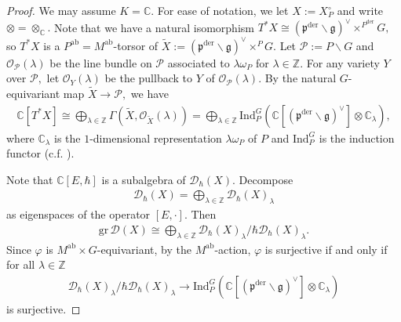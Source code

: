 \documentclass[11pt,a4paper,usenames,dvipsnames,reqno]{amsart}
\numberwithin{equation}{section}
\newcommand{\cc}{\mathbb C}
\newcommand{\zz}{\mathbb Z}
\newcommand{\fg}{\mathfrak g}
\newcommand{\fp}{\mathfrak p}
\newcommand{\der}{\mathrm{der}}
\theoremstyle{definition}
\theoremstyle{remark}
\begin{document}
\begin{proof}
We may assume $K=\cc$. For ease of notation, we let $X:=X_P^\circ$ and write $\otimes=\otimes_\cc.$ Note that we have a natural isomorphism $T^\ast X\cong (\mathfrak{p}^{\mathrm{der}}\backslash \mathfrak{g})^\vee\times ^{P^{\mathrm{der}}} G,$ so $T^\ast X$ is a $P^{\mathrm{ab}}=M^{\mathrm{ab}}$-torsor of $\widetilde{X}:= (\mathfrak{p}^{\mathrm{der}}\backslash \mathfrak{g})^\vee\times ^P G.$ Let $\mathcal{P}:=P\backslash G$ and $\mathcal{O}_{\mathcal{P}}(\lambda)$ be the line bundle on $\mathcal{P}$ associated to $\lambda\omega_P$ for $\lambda\in \zz.$ For any variety $Y$ over $\mathcal{P},$ let $\mathcal{O}_{Y}(\lambda)$ be the pullback to $Y$ of $\mathcal{O}_{\mathcal{P}}(\lambda).$ By the natural $G$-equivariant map $\widetilde{X}\longrightarrow \mathcal{P},$ we have 
\begin{align*}
    \cc[T^\ast X]\cong \bigoplus_{\lambda\in \zz} \Gamma(\widetilde{X},\mathcal{O}_{\widetilde{X}}(\lambda))= \bigoplus_{\lambda\in \zz} \mathrm{Ind}_P^G(\cc[(\fp^\der\backslash \fg)^\lor]\otimes \cc_{\lambda}),
\end{align*}
where $\cc_\lambda$ is the $1$-dimensional representation $\lambda\omega_P$ of $P$ and $\mathrm{Ind}_P^G$ is the induction functor (c.f. \cite[I.3]{Jantzen:rep}).



Note that $\cc[E,\hbar]$ is a subalgebra of $\mathcal{D}_\hbar(X).$ Decompose
\begin{align*}
    \mathcal{D}_{\hbar}(X)=\bigoplus_{\lambda \in \zz} \mathcal{D}_{\hbar}(X)_\lambda
\end{align*}
as eigenspaces of the operator $[E,\cdot].$ Then 
\begin{align*}
     \mathrm{gr}\, \mathcal{D}(X)\cong \bigoplus_{\lambda\in \zz}  \mathcal{D}_{\hbar}(X)_\lambda/\hbar \mathcal{D}_{\hbar}(X)_\lambda.
\end{align*}
Since $\varphi$ is $M^{\mathrm{ab}}\times G$-equivariant, by the $M^{\mathrm{ab}}$-action, $\varphi$ is surjective if and only if for all $\lambda\in \zz$ 
\begin{align*}
    \mathcal{D}_{\hbar}(X)_\lambda/\hbar \mathcal{D}_{\hbar}(X)_\lambda\longrightarrow\mathrm{Ind}_P^G(\cc[(\fp^\der\backslash \fg)^\lor]\otimes\cc_{\lambda})
\end{align*}
is surjective. 


\end{proof}
\end{document}
